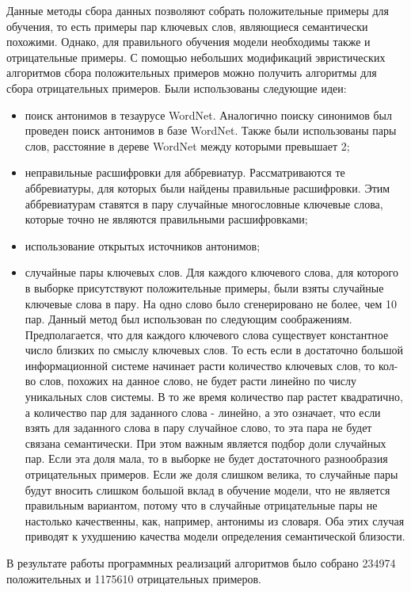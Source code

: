 Данные методы сбора данных позволяют собрать положительные примеры для обучения, то есть примеры пар ключевых слов, являющиеся семантически похожими. Однако, для правильного обучения модели необходимы также и отрицательные примеры. С помощью небольших модификаций эвристических алгоритмов сбора положительных примеров можно получить алгоритмы для сбора отрицательных примеров. Были использованы следующие идеи:
\begin{itemize}
    \item поиск антонимов в тезаурусе WordNet. Аналогично поиску синонимов был проведен поиск антонимов в базе WordNet. Также были использованы пары слов, расстояние в дереве WordNet между которыми превышает 2;
    \item неправильные расшифровки для аббревиатур. Рассматриваются те аббревиатуры, для которых были найдены правильные расшифровки. Этим аббревиатурам ставятся в пару случайные многословные ключевые слова, которые точно не являются правильными расшифровками;
    \item использование открытых источников антонимов;
    \item случайные пары ключевых слов. Для каждого ключевого слова, для которого в выборке присутствуют положительные примеры, были взяты случайные ключевые слова в пару. На одно слово было сгенерировано не более, чем 10 пар. Данный метод был использован по следующим соображениям. Предполагается, что для каждого ключевого слова существует константное число близких по смыслу ключевых слов. То есть если в достаточно большой информационной системе начинает расти количество ключевых слов, то кол-во слов, похожих на данное слово, не будет расти линейно по числу уникальных слов системы. В то же время количество пар растет квадратично, а количество пар для заданного слова - линейно, а это означает, что если взять для заданного слова в пару случайное слово, то эта пара не будет связана семантически. При этом важным является подбор доли случайных пар. Если эта доля мала, то в выборке не будет достаточного разнообразия отрицательных примеров. Если же доля слишком велика, то случайные пары будут вносить слишком большой вклад в обучение модели, что не является правильным вариантом, потому что в случайные отрицательные пары не настолько качественны, как, например, антонимы из словаря. Оба этих случая приводят к ухудшению качества модели определения семантической близости.
\end{itemize}

В результате работы программных реализаций алгоритмов было собрано 234974 положительных и 1175610 отрицательных примеров.

